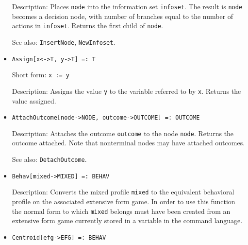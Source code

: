 \begin{itemize}
\bd
\item
[Description:] Places \verb+node+ into the information set
\verb+infoset+.  The result is \verb+node+ becomes a decision node,
with number of branches equal to the number of actions in \verb+infoset+.
Returns the first child of \verb+node+.
\item
[See also:] {\tt InsertNode}, {\tt NewInfoset}.
\ed

\item 
\protect \large \begin{verbatim}
Assign[x<->T, y->T] =: T
\end{verbatim} \normalsize

\bd
\item
[Short form:] \verb+x := y+
\item
[Description:] Assigns the value \verb+y+ to the variable referred to by
\verb+x+.  Returns the value assigned.
\ed

\item
\protect \large \begin{verbatim} 
AttachOutcome[node->NODE, outcome->OUTCOME] =: OUTCOME
\end{verbatim}\normalsize

\bd
\item
[Description:] Attaches the outcome \verb+outcome+ to the node \verb+node+.
Returns the outcome attached.  Note that nonterminal nodes may have
attached outcomes.
\item
[See also:] {\tt DetachOutcome}.
\ed


\item
\protect \large \begin{verbatim}
Behav[mixed->MIXED] =: BEHAV
\end{verbatim}\normalsize

\bd
\item
[Description:] Converts the mixed profile \verb+mixed+ to the equivalent
behavioral profile on the associated extensive form game.  In order to use
this function the normal form to which \verb+mixed+ belongs must have
been created from an extensive form game currently stored in a variable
in the command language.
\ed



\item
\protect \large \begin{verbatim} 
Centroid[efg->EFG] =: BEHAV
\end{verbatim}\normalsize


\end{itemize}
